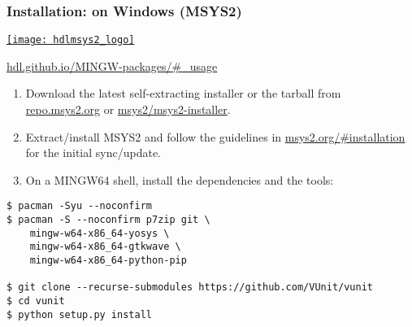 \documentclass[xcolor={usenames,dvipsnames,svgnames}]{beamer}
\begin{document}
\begin{frame}[fragile]
\frametitle{Installation: on Windows (MSYS2)}
\begin{center}
\begin{minipage}{.15\linewidth}
\href{https://github.com/hdl}{\texttt{[image: hdlmsys2\_logo]}}
\end{minipage}
\begin{minipage}{.65\linewidth}
\href{https://hdl.github.io/MINGW-packages/\#_usage}{hdl.github.io/MINGW-packages/\#\_usage}
\end{minipage}
\end{center}

\small
\begin{enumerate}
\item Download the latest self-extracting installer or the tarball from \href{http://repo.msys2.org/distrib/x86_64/}{repo.msys2.org}
or \href{https://github.com/msys2/msys2-installer/releases}{msys2/msys2-installer}.
\item Extract/install MSYS2 and follow the guidelines in \href{https://www.msys2.org/\#installation}{msys2.org/\#installation}
for the initial sync/update.
\item On a MINGW64 shell, install the dependencies and the tools:
\end{enumerate}
\begin{lstlisting}
$ pacman -Syu --noconfirm
$ pacman -S --noconfirm p7zip git \
    mingw-w64-x86_64-yosys \
    mingw-w64-x86_64-gtkwave \
    mingw-w64-x86_64-python-pip

$ git clone --recurse-submodules https://github.com/VUnit/vunit
$ cd vunit
$ python setup.py install
\end{lstlisting}
\end{frame}
\end{document}

